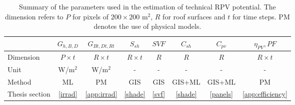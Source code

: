 \begin{table}[tb]
\centering
\footnotesize
\caption{Summary of the parameters used in the estimation of technical RPV potential. The dimension refers to $P$ for pixels of $200 \times 200$ m$^2$, $R$ for roof surfaces and $t$ for time steps. PM denotes the use of physical models.}
\label{tab:vars}
\begin{tabular} {lccccccc} %
\hline 
  & $G_{h,B,D}$ & $G_{Bt,Dt,Rt}$ & $S_{sh}$   & $\mathit{SVF}$  & $C_{sh}$  & $C_{\mathit{pv}}$ & $\eta_{PV}, \mathit{PF}$     
  \\
\hline 
Dimension & $P \times t$ & $R \times t$ & $R \times t$ & $R$   & $R$     & $R$      & $R \times t$  
\\
Unit     & W/m$^2$    & W/m$^2$  & -                          & -                  & -                    & -                     & -                             
\\
Method      & ML & PM & GIS & GIS & GIS+ML & GIS+ML & PM \\
Thesis section      & \ref{irrad}  & \ref{app:irrad}     & \ref{shade}       & \ref{svf} & \ref{shade} & \ref{panels} & \ref{app:efficiency} 
\\  
\hline 
\end{tabular}
\end{table}

